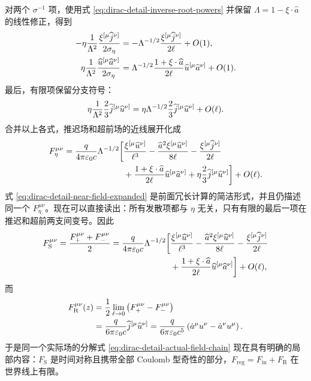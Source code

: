对两个 $\sigma^{-1}$ 项，使用式 \eqref{eq:dirac-detail-inverse-root-powers} 并保留 $\Lambda=1-\xi\cdot \widehat a$ 的线性修正，得到
\begin{align}
 -\eta{1\over\Lambda^2}
 {\xi^{[\mu}\widehat j^{\nu]}\over2\sigma_\eta}
 &=-\Lambda^{-1/2}
 {\xi^{[\mu}\widehat j^{\nu]}\over2\ell}+O(1),
 \notag\\
 \eta{1\over\Lambda^2}
 {\widehat u^{[\mu}\widehat a^{\nu]}\over2\sigma_\eta}
 &=\Lambda^{-1/2}
 {1+\xi\cdot \widehat a\over2\ell}
 \widehat u^{[\mu}\widehat a^{\nu]}+O(1).
 \label{eq:dirac-detail-root-substitution-inverse}
\end{align}
最后，有限项保留分支符号：
\begin{equation}
 \eta{1\over\Lambda^2}{2\over3}\widehat j^{[\mu}\widehat u^{\nu]}
 =\eta\Lambda^{-1/2}{2\over3}\widehat j^{[\mu}\widehat u^{\nu]}+O(\ell).
 \label{eq:dirac-detail-root-substitution-finite}
\end{equation}
合并以上各式，推迟场和超前场的近线展开化成
\begin{align}
 F_\eta^{\mu\nu}
 ={q\over4\pi\varepsilon_0c}\Lambda^{-1/2}
 \bigg[{}
 &{\xi^{[\mu}\widehat u^{\nu]}\over\ell^3}
 -{\widehat a^2\xi^{[\mu}\widehat u^{\nu]}\over8\ell}
 -{\xi^{[\mu}\widehat j^{\nu]}\over2\ell}
 \notag\\
 &+{1+\xi\cdot \widehat a\over2\ell}\widehat u^{[\mu}\widehat a^{\nu]}
 +\eta{2\over3}\widehat j^{[\mu}\widehat u^{\nu]}
 \bigg]+O(\ell).
 \label{eq:dirac-detail-near-field-expanded}
\end{align}
式 \eqref{eq:dirac-detail-near-field-expanded} 是前面冗长计算的简洁形式，并且仍描述同一个 $F_\eta^{\mu\nu}$。现在可以直接读出：所有发散项都与 $\eta$ 无关，只有有限的最后一项在推迟和超前两支间变号。因此
\begin{align}
 F_{\mathrm S}^{\mu\nu}
 ={F_{+}^{\mu\nu}+F_{-}^{\mu\nu}\over2}
 ={q\over4\pi\varepsilon_0c}\Lambda^{-1/2}
 \bigg[{}
 &{\xi^{[\mu}\widehat u^{\nu]}\over\ell^3}
 -{\widehat a^2\xi^{[\mu}\widehat u^{\nu]}\over8\ell}
 -{\xi^{[\mu}\widehat j^{\nu]}\over2\ell}
 \notag\\
 &+{1+\xi\cdot \widehat a\over2\ell}\widehat u^{[\mu}\widehat a^{\nu]}
 \bigg]+O(\ell),
 \label{eq:dirac-detail-singular-field-explicit}
\end{align}
而
\begin{align}
 F_{\mathrm R}^{\mu\nu}(z)
 &={1\over2}\lim_{\ell\to0}
 \left(F_{+}^{\mu\nu}-F_{-}^{\mu\nu}\right)
 \notag\\
 &={q\over6\pi\varepsilon_0c}\widehat j^{[\mu}\widehat u^{\nu]}
 ={q\over6\pi\varepsilon_0c^5}
 \left(\dot a^\mu u^\nu-\dot a^\nu u^\mu\right).
 \label{eq:dirac-detail-regular-field-worldline}
\end{align}
于是同一个实际场的分解式 \eqref{eq:dirac-detail-actual-field-chain} 现在具有明确的局部内容：$F_{\mathrm S}$ 是时间对称且携带全部 Coulomb 型奇性的部分，$F_{\mathrm{reg}}=F_{\mathrm{in}}+F_{\mathrm R}$ 在世界线上有限。

